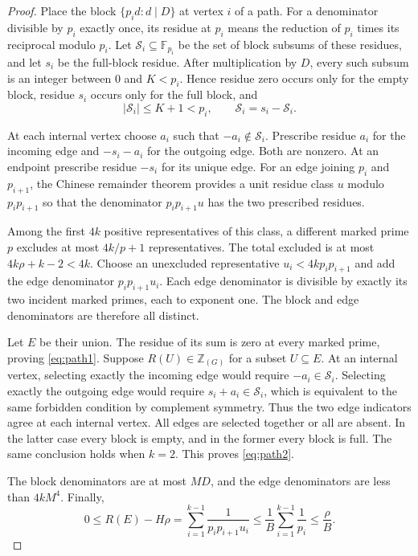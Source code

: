 \documentclass[11pt,leqno]{amsart}
\numberwithin{equation}{section}
\theoremstyle{definition}
\theoremstyle{remark}
\newcommand{\Z}{\mathbb Z}
\newcommand{\card}[1]{\lvert #1\rvert}
\begin{document}
\begin{proof}
Place the block $\{p_i d:d\mid D\}$ at vertex $i$ of a path.
For a denominator divisible by $p_i$ exactly once, its residue at $p_i$
means the reduction of $p_i$ times its reciprocal modulo $p_i$.
Let $\mathcal S_i\subseteq\mathbb F_{p_i}$ be the set of block subsums
of these residues, and let $s_i$ be the full-block residue.
After multiplication by $D$, every such subsum is an integer between
$0$ and $K<p_i$. Hence residue zero occurs only for the empty block,
residue $s_i$ occurs only for the full block, and
\[
 \card{\mathcal S_i}\le K+1<p_i,
 \qquad \mathcal S_i=s_i-\mathcal S_i.
\]

At each internal vertex choose $a_i$ such that
$-a_i\notin\mathcal S_i$. Prescribe residue $a_i$ for the incoming
edge and $-s_i-a_i$ for the outgoing edge. Both are nonzero.
At an endpoint prescribe residue $-s_i$ for its unique edge.
For an edge joining $p_i$ and $p_{i+1}$, the Chinese remainder theorem
provides a unit residue class $u$ modulo $p_ip_{i+1}$ so that the
denominator $p_ip_{i+1}u$ has the two prescribed residues.

Among the first $4k$ positive representatives of this class, a different
marked prime $p$ excludes at most $4k/p+1$ representatives.
The total excluded is at most $4k\rho+k-2<4k$.
Choose an unexcluded representative $u_i<4kp_ip_{i+1}$ and add the edge
denominator $p_ip_{i+1}u_i$. Each edge denominator is divisible by exactly
its two incident marked primes, each to exponent one. The block and edge
denominators are therefore all distinct.

Let $E$ be their union. The residue of its sum is zero at every marked
prime, proving \eqref{eq:path1}. Suppose $R(U)\in\Z_{(G)}$ for a subset
$U\subseteq E$. At an internal vertex, selecting exactly the incoming
edge would require $-a_i\in\mathcal S_i$. Selecting exactly the outgoing
edge would require $s_i+a_i\in\mathcal S_i$, which is equivalent to the
same forbidden condition by complement symmetry. Thus the two edge
indicators agree at each internal vertex. All edges are selected together
or all are absent. In the latter case every block is empty, and in the
former every block is full. The same conclusion holds when $k=2$.
This proves \eqref{eq:path2}.

The block denominators are at most $MD$, and the edge denominators are
less than $4kM^4$. Finally,
\[
 0\le R(E)-H\rho
 =\sum_{i=1}^{k-1}\frac1{p_ip_{i+1}u_i}
 \le\frac1B\sum_{i=1}^{k-1}\frac1{p_i}\le\frac\rho B.
\]
\end{proof}
\end{document}
